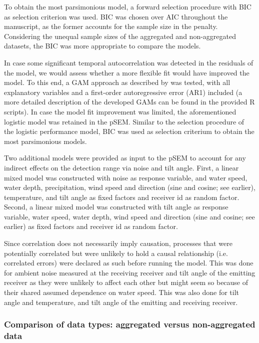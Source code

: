 \documentclass[doublespacing,linenumbers]{bmcart}
\begin{document}
To obtain the most parsimonious model, a forward selection procedure with BIC as selection criterion was used. BIC was chosen over AIC throughout the manuscript, as the former accounts for the sample size in the penalty. Considering the unequal sample sizes of the aggregated and non-aggregated datasets, the BIC was more appropriate to compare the models. 

In case some significant temporal autocorrelation was detected in the residuals of the model, we would assess whether a more flexible fit would have improved the model. To this end, a GAM approach as described by \cite{OBrien2021InfluenceBight} was tested, with all explanatory variables and a first-order autoregressive error (AR1) included (a more detailed description of the developed GAMs can be found in the provided R scripts). In case the model fit improvement was limited, the aforementioned logistic model was retained in the pSEM. Similar to the selection procedure of the logistic performance model, BIC was used as selection criterium to obtain the most parsimonious models. 

Two additional models were provided as input to the pSEM to account for any indirect effects on the detection range via noise and tilt angle. First, a linear mixed model was constructed with noise as response variable, and water speed, water depth, precipitation, wind speed and direction (sine and cosine; see earlier), temperature, and tilt angle as fixed factors and receiver id as random factor. Second, a linear mixed model was constructed with tilt angle as response variable, water speed, water depth, wind speed and direction (sine and cosine; see earlier) as fixed factors and receiver id as random factor. 

Since correlation does not necessarily imply causation, processes that were potentially correlated but were unlikely to hold a causal relationship (i.e. correlated errors) were declared as such before running the model. This was done for ambient noise measured at the receiving receiver and tilt angle of the emitting receiver as they were unlikely to affect each other but might seem so because of their shared assumed dependence on water speed. This was also done for tilt angle and temperature, and tilt angle of the emitting and receiving receiver.  

\subsubsection*{Comparison of data types: aggregated versus non-aggregated data}
\end{document}
